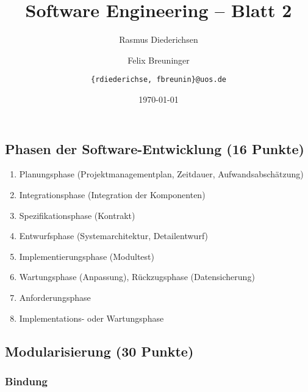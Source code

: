 \documentclass{scrartcl}
\title{\rmfamily Software Engineering -- Blatt 2}
\author{Rasmus Diederichsen \and Felix Breuninger\and %
   \texttt{\{rdiederichse, fbreunin\}@uos.de}
}
\date{\today}
\begin{document}
\selectfont
\maketitle


\setcounter{section}{2}
\setcounter{subsection}{0}
\subsection{Phasen der Software-Entwicklung (16 Punkte)}
\begin{enumerate}[label=\alph{*})]
   \item Planungsphase (Projektmanagementplan, Zeitdauer, Aufwandsabschätzung)
   \item Integrationsphase (Integration der Komponenten)
   \item Spezifikationsphase (Kontrakt)
   \item Entwurfsphase (Systemarchitektur, Detailentwurf)
   \item Implementierungsphase (Modultest)
   \item Wartungsphase (Anpassung), Rückzugsphase (Datensicherung)
   \item Anforderungsphase
   \item Implementations- oder Wartungsphase
\end{enumerate}
\subsection{Modularisierung (30 Punkte)}


\subsubsection{Bindung}
\end{document}
